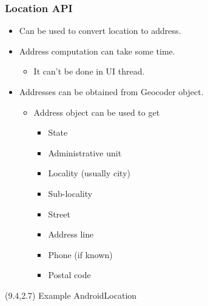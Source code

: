 \documentclass[10pt,xcolor=pdflatex]{beamer}
\begin{document}
\begin{frame}[fragile]\frametitle{Location API}
\begin{itemize}
	\item Can be used to convert location to address.
	\item Address computation can take some time.
	  \begin{itemize}
		\item It can't be done in UI thread.
	  \end{itemize}
    \item Addresses can be obtained from Geocoder object.
	  \begin{itemize}
		\item Address object can be used to get
          \begin{itemize}
            \item State
	        \item Administrative unit
	        \item Locality (usually city)
	        \item Sub-locality
	        \item Street
	        \item Address line
	        \item Phone (if known)
	        \item Postal code
          \end{itemize}
	  \end{itemize}
\end{itemize}
\begin{textblock}{15}(9.4,2.7)
    {\footnotesize Example AndroidLocation}
\end{textblock}
\end{frame}
\end{document}
